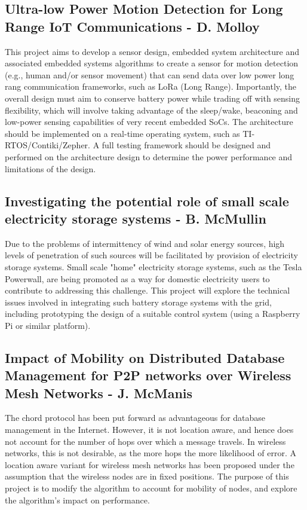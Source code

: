 \documentclass[a4paper]{article}
\begin{document}
\subsection{Ultra-low Power Motion Detection for Long Range IoT Communications -
D. Molloy}

This project aims to develop a sensor design, embedded system architecture and associated embedded systems algorithms to create a sensor for motion detection (e.g., human and/or sensor movement) that can send data over low power long rang communication frameworks, such as LoRa (Long Range). Importantly, the overall design must aim to conserve battery power while trading off with sensing flexibility, which will involve taking advantage of the sleep/wake, beaconing and low-power sensing capabilities of very recent embedded SoCs. The architecture should be implemented on a real-time operating system, such as TI-RTOS/Contiki/Zepher. A full testing framework should be designed and performed on the architecture design to determine the power performance and limitations of the design.

\subsection{Investigating the potential role of small scale electricity storage
systems - B. McMullin}

Due to the problems of intermittency of wind and solar energy sources, high levels of penetration of such sources will be facilitated by provision of electricity storage systems. Small scale "home" electricity storage systems, such as the Tesla Powerwall, are being promoted as a way for domestic electricity users to contribute to addressing this challenge. This project will explore the technical issues involved in integrating such battery storage systems with the grid, including prototyping the design of a suitable control system (using a Raspberry Pi or similar platform).

\subsection{Impact of Mobility on Distributed Database Management for P2P
networks over Wireless Mesh Networks - J. McManis}

The chord protocol has been put forward as advantageous for database management in the
Internet.  However, it is not location aware, and hence does not account for the number of hops over which a message travels.  In wireless networks, this is not desirable, as the more hops the more likelihood of error.  A location aware variant for wireless mesh networks has
been proposed under the assumption that the wireless nodes are in fixed positions.  The purpose of this project is to modify the algorithm to account for mobility of nodes, and explore the algorithm’s impact on performance.
\end{document}
